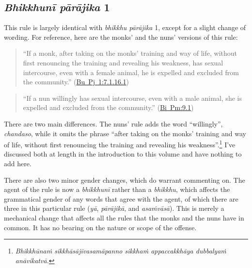 \documentclass[12pt,openany]{book}%
\begin{document}
\subsection*{\textit{\textsanskrit{Bhikkhunī} \textsanskrit{pārājika}} 1}

This rule is largely identical with \textit{bhikkhu \textsanskrit{pārājika}} 1, except for a slight change of wording. For reference, here are the monks’ and the nuns’ versions of this rule:

\begin{quotation}%
“If a monk, after taking on the monks’ training and way of life, without first renouncing the training and revealing his weakness, has sexual intercourse, even with a female animal, he is expelled and excluded from the community.” (\href{https://suttacentral.net/pli-tv-bu-vb-pj1/en/brahmali\#7.1.16.1}{Bu~Pj~1:7.1.16.1})

%
\end{quotation}

\begin{quotation}%
“If a nun willingly has sexual intercourse, even with a male animal, she is expelled and excluded from the community.” (\href{https://suttacentral.net/pli-tv-bi-pm/en/brahmali\#9.1}{Bi~Pm:9.1})

%
\end{quotation}

There are two main differences. The nuns’ rule adds the word “willingly”, \textit{chandaso}, while it omits the phrase “after taking on the monks’ training and way of life, without first renouncing the training and revealing his weakness”.\footnote{\textit{\textsanskrit{Bhikkhūnaṁ} \textsanskrit{sikkhāsājīvasamāpanno} \textsanskrit{sikkhaṁ} \textsanskrit{appaccakkhāya} \textsanskrit{dubbalyaṁ} \textsanskrit{anāvikatvā}.} } I’ve discussed both at length in the introduction to this volume and have nothing to add here.

There are also two minor gender changes, which do warrant commenting on. The agent of the rule is now a \textit{\textsanskrit{bhikkhunī}} rather than a \textit{bhikkhu}, which affects the grammatical gender of any words that agree with the agent, of which there are three in this particular rule (\textit{\textsanskrit{yā}}, \textit{\textsanskrit{pārājikā}}, and \textit{\textsanskrit{asaṁvāsā}}). This is merely a mechanical change that affects all the rules that the monks and the nuns have in common. It has no bearing on the nature or scope of the offense.
\end{document}

